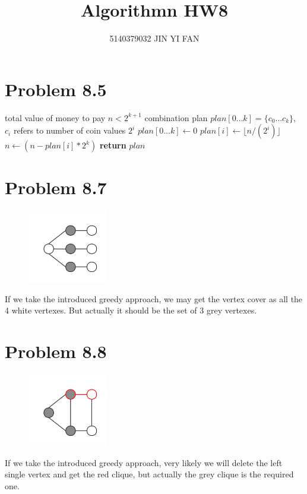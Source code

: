 \documentclass[a4paper]{article}
\title{\textbf{Algorithmn HW8}}
\author{5140379032 JIN YI FAN}
\date{}
\begin{document}
\maketitle
\begin{spacing}{1.3}
\section*{Problem 8.5}
\begin{algorithmic}[1]
\Require total value of money to pay $n<2^{k+1}$
\Ensure combination plan $plan[0\ldots k]=\{c_0\ldots c_k\}$, $c_i$ refers to number of coin values $2^i$
\State $plan[0\ldots k]\gets 0$
\State $plan[i]\gets \lfloor n/(2^i)\rfloor$
\State $n\gets (n-plan[i]*2^k)$
\EndFor
\State \textbf{return} $plan$
\end{algorithmic}

\begin{multicols}{2}
\section*{Problem 8.7}
\begin{multicols}{2}
\begin{figure}[H]
    \centering
    \includegraphics[width=3.5cm]{vertex.png}
\end{figure}
If we take the introduced greedy approach, 
we may get the vertex cover as all the 4 white vertexes.
But actually it should be the set of 3 grey vertexes.
\end{multicols}

\section*{Problem 8.8}
\begin{multicols}{2}
\begin{figure}[H]
    \centering
    \includegraphics[width=3.5cm]{clique.png}
\end{figure}
If we take the introduced greedy approach,
very likely we will delete the left single vertex and get 
the red clique, but actually the grey clique is the required one. 
\end{multicols}
\end{multicols}


\end{spacing}
\end{document}
